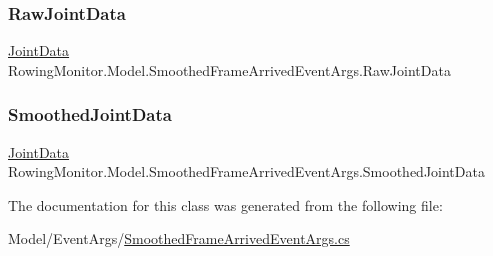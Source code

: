 \subsubsection{\texorpdfstring{Raw\+Joint\+Data}{RawJointData}}
{\footnotesize\ttfamily \hyperlink{struct_rowing_monitor_1_1_model_1_1_util_1_1_joint_data}{Joint\+Data} Rowing\+Monitor.\+Model.\+Smoothed\+Frame\+Arrived\+Event\+Args.\+Raw\+Joint\+Data\hspace{0.3cm}{\ttfamily [get]}}

\mbox{\label{class_rowing_monitor_1_1_model_1_1_smoothed_frame_arrived_event_args_adee9a15912d769914f058a7e984948d6}} 
\subsubsection{\texorpdfstring{Smoothed\+Joint\+Data}{SmoothedJointData}}
{\footnotesize\ttfamily \hyperlink{struct_rowing_monitor_1_1_model_1_1_util_1_1_joint_data}{Joint\+Data} Rowing\+Monitor.\+Model.\+Smoothed\+Frame\+Arrived\+Event\+Args.\+Smoothed\+Joint\+Data\hspace{0.3cm}{\ttfamily [get]}}



The documentation for this class was generated from the following file\+:\begin{DoxyCompactItemize}
\item 
Model/\+Event\+Args/\hyperlink{_smoothed_frame_arrived_event_args_8cs}{Smoothed\+Frame\+Arrived\+Event\+Args.\+cs}\end{DoxyCompactItemize}
